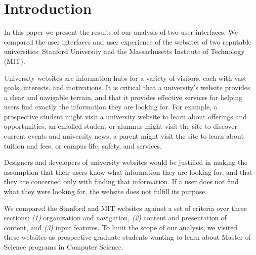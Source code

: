 \section*{Introduction}

In this paper we present the results of our analysis of two user interfaces.
We compared the user interfaces and user experience of the websites of two
reputable universities: Stanford University and the Massachusetts Institute
of Technology (MIT).

University websites are information hubs for a variety of visitors, each with
vast goals, interests, and motivations. It is critical that a university's
website provides a clear and navigable terrain, and that it provides effective
services for helping users find exactly the information they are looking for.
For example, a prospective student might visit a university website to learn about
offerings and opportunities, an enrolled student or alumnus might visit the site
to discover current events and university news, a parent might visit the site
to learn about tuition and fees, or campus life, safety, and services.

Designers and developers of university websites would be justified in making
the assumption that their users know what information they are looking for,
and that they are concerned only with finding that information. If a user
does not find what they were looking for, the website does not fulfill its
purpose.

We compared the Stanford and MIT websites against a set of criteria over
three sections: \textit{(1)} organization and navigation, \textit{(2)}
content and presentation of content, and \textit{(3)} input features.
To limit the scope of our analysis, we visited these websites as prospective
graduate students wanting to learn about Master of Science programs in
Computer Science.